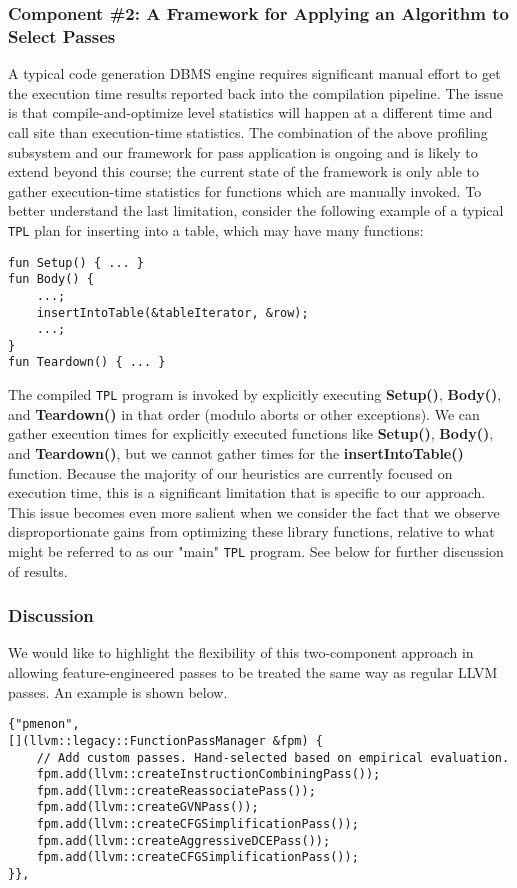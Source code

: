 \documentclass{vldb}
\newcommand{\tpl}{\texttt{TPL}\xspace}
\newcommand{\dbCode}[1]{{\sffamily\small \textbf{#1}}\xspace}
\begin{document}
\subsubsection{Component \#2: A Framework for Applying an Algorithm to Select Passes}

A typical code generation DBMS engine requires significant manual effort to get the execution time results reported back into the compilation pipeline. The issue is that compile-and-optimize level statistics will happen at a different time and call site than execution-time statistics. The combination of the above profiling subsystem and our framework for pass application is ongoing and is likely to extend beyond this course; the current state of the framework is only able to gather execution-time statistics for functions which are manually invoked. To better understand the last limitation, consider the following example of a typical \tpl plan for inserting into a table, which may have many functions:

\begin{lstlisting}
fun Setup() { ... }
fun Body() { 
    ...;
    insertIntoTable(&tableIterator, &row);
    ...;
}
fun Teardown() { ... }
\end{lstlisting}

The compiled \tpl program is invoked by explicitly executing \dbCode{Setup()}, \dbCode{Body()}, and \dbCode{Teardown()} in that order (modulo aborts or other exceptions). We can gather execution times for explicitly executed functions like \dbCode{Setup()}, \dbCode{Body()}, and \dbCode{Teardown()}, but we cannot gather times for the \dbCode{insertIntoTable()} function. Because the majority of our heuristics are currently focused on execution time, this is a significant limitation that is specific to our approach. This issue becomes even more salient when we consider the fact that we observe disproportionate gains from optimizing these library functions, relative to what might be referred to as our "main" \tpl program. See below for further discussion of results.

\subsubsection{Discussion}

We would like to highlight the flexibility of this two-component approach in allowing feature-engineered passes to be treated the same way as regular LLVM passes. An example is shown below.

\begin{lstlisting}
{"pmenon",
[](llvm::legacy::FunctionPassManager &fpm) {
    // Add custom passes. Hand-selected based on empirical evaluation.
    fpm.add(llvm::createInstructionCombiningPass());
    fpm.add(llvm::createReassociatePass());
    fpm.add(llvm::createGVNPass());
    fpm.add(llvm::createCFGSimplificationPass());
    fpm.add(llvm::createAggressiveDCEPass());
    fpm.add(llvm::createCFGSimplificationPass());
}}, 
\end{lstlisting}
\end{document}
